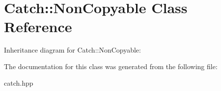 \hypertarget{classCatch_1_1NonCopyable}{}\section{Catch\+:\+:Non\+Copyable Class Reference}
\label{classCatch_1_1NonCopyable}


Inheritance diagram for Catch\+:\+:Non\+Copyable\+:


The documentation for this class was generated from the following file\+:\begin{DoxyCompactItemize}
\item 
catch.\+hpp\end{DoxyCompactItemize}
